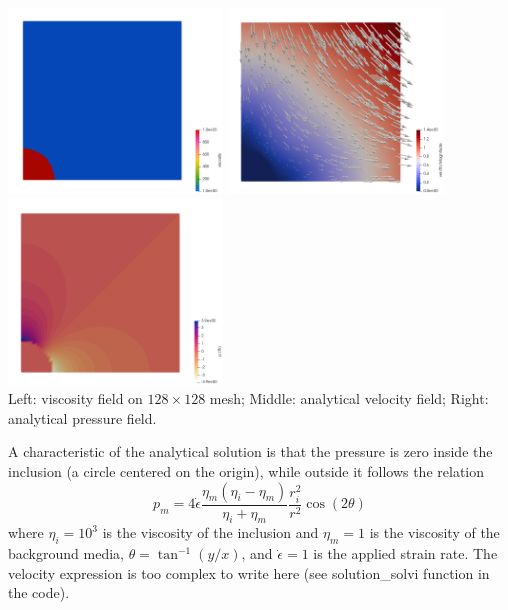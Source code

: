 \begin{center}
\includegraphics[width=5.7cm]{python_codes/fieldstone_161/results/bench4/eta}
\includegraphics[width=5.7cm]{python_codes/fieldstone_161/results/bench4/vel_th}
\includegraphics[width=5.7cm]{python_codes/fieldstone_161/results/bench4/press_th}\\
{\captionfont Left: viscosity field on $128\times 128$ mesh; Middle: 
analytical velocity field; Right: analytical pressure field.}
\end{center}

A characteristic of the analytical solution is that the pressure is zero 
inside the inclusion (a circle centered on the origin), while outside it follows the relation
\[
p_m = 4 \dot{\epsilon}
\frac{\eta_m(\eta_i-\eta_m)}{\eta_i+\eta_m}
\frac{r_i^2}{r^2} \cos(2\theta)
\]
where $\eta_i = 10^3$ is the viscosity of the inclusion 
and $\eta_m = 1$ is the viscosity of the background media, $\theta=\tan^{-1}(y/x)$,
and $\dot{\epsilon}=1$ is the applied strain rate.
The velocity expression is too complex to write here (see {\python solution\_solvi}
function in the code).

